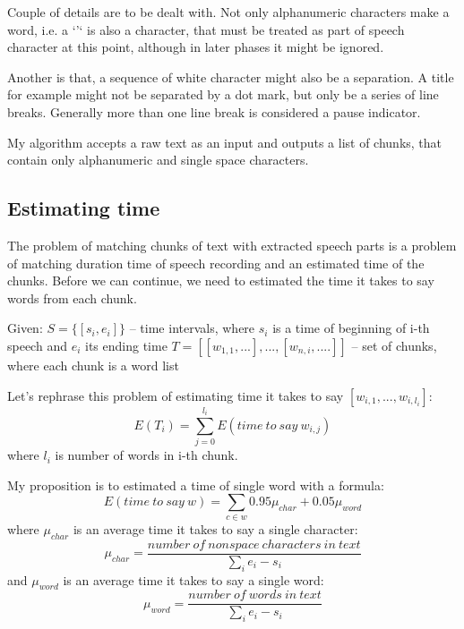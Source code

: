 \documentclass[12pt,a4paper,english]{article}
\begin{document}
Couple of details are to be dealt with. Not only alphanumeric characters make a word, i.e. a `'` is also a character, that must be treated as part of speech character at this point, although in later phases it might be ignored. \newline

Another is that, a sequence of white character might also be a separation. A title for example might not be separated by a dot mark, but only be a series of line breaks. Generally more than one line break is considered a pause indicator. \newline

My algorithm accepts a raw text as an input and outputs a list of chunks, that contain only alphanumeric and single space characters.

\newpage

\subsection{Estimating time}

The problem of matching chunks of text with extracted speech parts is a problem of matching duration time of speech recording and
an estimated time of the chunks. Before we can continue, we need to estimated the time it takes to say words from each chunk. \newline

Given: \newline
	 $S=\{[s_i, e_i]\}$	– time intervals, where $s_i$ is a time of beginning of i-th speech and $e_i$ its ending time  \newline
	 $T = [[w_{1, 1}, ...], ..., [w_{n, i}, ....] ]$	– set of chunks, where each chunk is a word list \newline

Let's rephrase this problem of estimating time it takes to say $[w_{i, 1}, ..., w_{i, l_i}]$:
\begin {equation}
    E(T_i) = \sum_{j=0}^{l_i} E(time \: to \: say \: w_{i, j})
\end {equation}
where $l_i$ is number of words in i-th chunk. \newline

My proposition is to estimated a time of single word with a formula:
\begin {equation}
    E(time \: to \: say \: w) = \sum_{c \in w} 0.95 \mu_{char} + 0.05 \mu_{word}
\end {equation}
where  $\mu_{char}$ is an average time it takes to say a single character:
\begin {equation}
    \mu_{char} = \frac {number \: of \: nonspace \: characters \: in \: text} {\sum_i e_i - s_i}
\end {equation}
and $\mu_{word}$ is an average time it takes to say a single word:
\begin {equation}
    \mu_{word} = \frac {number \: of \: words \: in \: text} {\sum_i e_i - s_i}
\end {equation}
	
\end{document}
